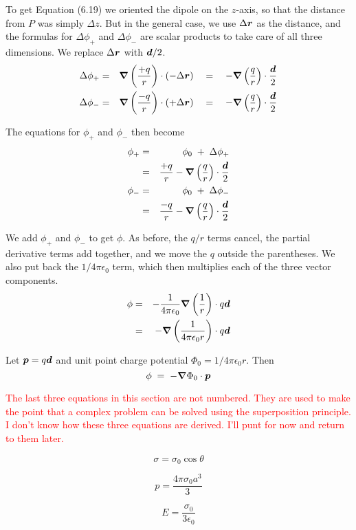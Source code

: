 To get Equation (6.19) we oriented the dipole on the $z$-axis,
so that the distance from $P$ was simply $\Delta z$.
But in the general case, we use $\Delta\boldsymbol{r}$ as the distance,
and the formulas for $\Delta\phi_+$ and $\Delta\phi_-$ are scalar products
to take care of all three dimensions.
We replace $\Delta\boldsymbol{r}$ with $\boldsymbol{d}/2$.
\begin{eqnarray*}
  \Delta\phi_+ &=& \boldsymbol{\nabla}\left(\frac{+q}{r}\right)\cdot\left(-\Delta\boldsymbol{r}\right) 
  \quad = \quad -\boldsymbol{\nabla}\left(\frac{q}{r}\right)\cdot\frac{\boldsymbol{d}}{2} \\
  \Delta\phi_- &=& \boldsymbol{\nabla}\left(\frac{-q}{r}\right)\cdot\left(+\Delta\boldsymbol{r}\right)
  \quad = \quad -\boldsymbol{\nabla}\left(\frac{q}{r}\right)\cdot\frac{\boldsymbol{d}}{2}
\end{eqnarray*}

The equations for $\phi_+$ and $\phi_-$ then become
\begin{eqnarray*}
  \phi_+ &=& \phi_0 \; + \; \Delta\phi_+ \\
         &=& \frac{+q}{r} - \boldsymbol{\nabla}\left(\frac{q}{r}\right) \cdot \frac{\boldsymbol{d}}{2} \\
  \phi_- &=& \phi_0 \; + \; \Delta\phi_- \\
         &=& \frac{-q}{r} - \boldsymbol{\nabla}\left(\frac{q}{r}\right) \cdot \frac{\boldsymbol{d}}{2} \\
\end{eqnarray*}

We add $\phi_+$ and $\phi_-$ to get $\phi$.
As before, the $q/r$ terms cancel, the partial derivative terms add together, 
and we move the $q$ outside the parentheses.
We also put back the $1/4\pi\epsilon_0$ term, which then multiplies each of the three
vector components.
\begin{eqnarray*}
  \phi &=& -\frac{1}{4\pi\epsilon_0}\boldsymbol{\nabla}\left(\frac{1}{r}\right) \cdot q \boldsymbol{d} \\
       &=& -\boldsymbol{\nabla} \left(\frac{1}{4\pi\epsilon_0 r}\right) \cdot q \boldsymbol{d}
\end{eqnarray*}

Let $\boldsymbol{p}=q\boldsymbol{d}$ and
unit point charge potential $\Phi_0=1/4\pi\epsilon_0 r$. Then
\begin{equation}
  \phi\; = \; -\boldsymbol{\nabla}\Phi_0 \cdot \boldsymbol{p} 
\end{equation}

\textcolor{red}{The last three equations in this section are not numbered.
They are used to make the point that a complex problem can be solved
using the superposition principle.
I don't know how these three equations are derived.
I'll punt for now and return to them later.}

\begin{equation*}
  \sigma = \sigma_0 \cos \theta
\end{equation*}

\begin{equation*}
  p = \frac{4\pi\sigma_0 a^3}{3}
\end{equation*}

\begin{equation*}
  E = \frac{\sigma_0}{3\epsilon_0}
\end{equation*}

